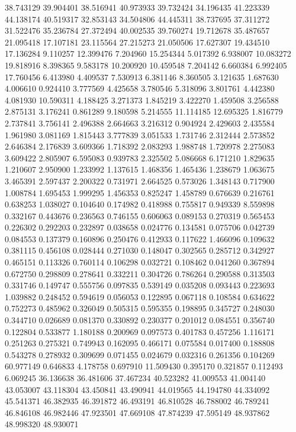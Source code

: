38.743129
39.904401
38.516941
40.973933
39.732424
34.196435
41.223339
44.138174
40.519317
32.853143
34.504806
44.445311
38.737695
37.311272
31.522476
35.236784
27.372494
40.002535
39.760274
19.712678
35.487657
21.095418
17.107181
23.115564
27.215273
21.050506
17.627307
19.434510
17.136284
9.110257
12.399476
7.204960
15.254344
5.017392
6.938007
10.083272
19.818916
8.398365
9.583178
10.200920
10.459548
7.204142
6.660384
6.992405
17.760456
6.413980
4.409537
7.530913
6.381146
8.360505
3.121635
1.687630
4.006610
0.924410
3.777569
4.425658
3.780546
5.318096
3.801761
4.442380
4.081930
10.590311
4.188425
3.271373
1.845219
3.422270
1.459508
3.256588
2.875131
3.176241
0.861289
9.180598
5.214555
11.114185
12.695325
1.816779
2.737841
3.756141
2.496388
2.664663
3.216312
0.904924
2.429603
2.435584
1.961980
3.081169
1.815443
3.777839
3.051533
1.731746
2.312444
2.573852
2.646384
2.176839
3.609366
1.718392
2.083293
1.988748
1.720978
2.275083
3.609422
2.805907
6.595083
0.939783
2.325502
5.086668
6.171210
1.829635
1.210607
2.950900
1.233992
1.137615
1.468356
1.465436
1.238679
1.063675
3.465391
2.597437
2.200322
0.731971
2.664525
0.573026
1.348143
0.717900
1.008784
1.695453
1.999295
1.456353
0.825247
1.458789
0.676639
0.216761
0.638253
1.038027
0.104640
0.174982
0.418988
0.755817
0.949339
8.559898
0.332167
0.443676
0.236563
0.746155
0.606063
0.089153
0.270319
0.565453
0.226302
0.292203
0.232897
0.038658
0.024776
0.134581
0.075706
0.042739
0.084553
0.137379
0.160896
0.250476
0.412933
0.117622
1.466096
0.109632
0.381115
0.456108
0.028444
0.271030
0.148047
0.302565
0.285712
0.342927
0.465151
0.113326
0.760114
0.106298
0.032721
0.108462
0.041260
0.367894
0.672750
0.298809
0.278641
0.332211
0.304726
0.786264
0.290588
0.313503
0.331746
0.149747
0.555756
0.097835
0.539149
0.035208
0.093443
0.223693
1.039882
0.248452
0.594619
0.056053
0.122895
0.067118
0.108584
0.634622
0.752273
0.485962
0.326049
0.505315
0.595355
0.198895
0.345727
0.248030
0.344710
0.026689
0.081370
0.330892
0.230377
0.201012
0.084551
0.356740
0.122804
0.533877
1.180188
0.200969
0.097573
0.401783
0.457256
1.116171
0.251263
0.275321
0.749943
0.162095
0.466171
0.075584
0.017400
0.188808
0.543278
0.278932
0.309699
0.071455
0.024679
0.032316
0.261356
0.104269
60.977149
0.646833
4.178758
0.697910
11.509430
0.395170
0.321857
0.112493
6.069245
36.136638
36.481606
37.467234
40.523282
41.009553
41.004140
43.053007
43.118304
43.450841
43.490941
44.019565
44.194780
44.334092
45.541371
46.382935
46.391872
46.493191
46.810528
46.788002
46.789241
46.846108
46.982446
47.923501
47.669108
47.874239
47.595149
48.937862
48.998320
48.930071
